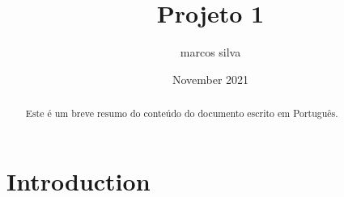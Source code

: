 \documentclass{article}
\title{Projeto 1}
\author{marcos silva}
\date{November 2021}
\begin{document}
\maketitle

\vspace{2cm}

\begin{abstract}
Este é um breve resumo do conteúdo do documento escrito em Português.
\end{abstract}

\section{Introduction}
\end{document}
